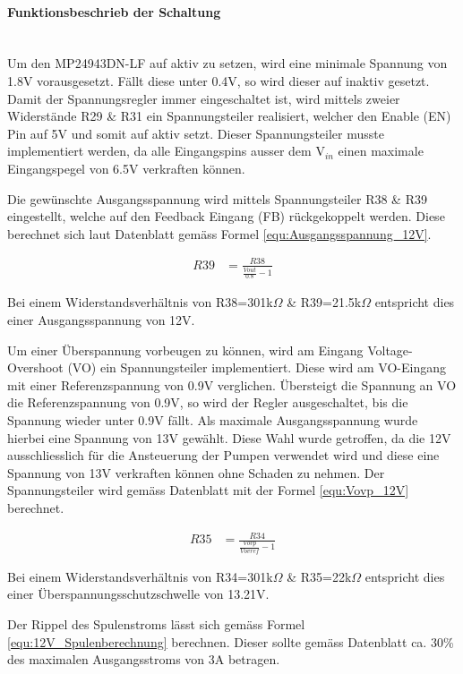 \paragraph{Funktionsbeschrieb der Schaltung}\mbox{}\\

Um den MP24943DN-LF auf aktiv zu setzen, wird eine minimale Spannung von 1.8V vorausgesetzt. Fällt diese unter 0.4V, so wird dieser auf inaktiv gesetzt. Damit der Spannungsregler immer eingeschaltet ist, wird mittels zweier Widerstände R29 \& R31 ein Spannungsteiler realisiert, welcher den Enable (EN) Pin auf 5V und somit auf aktiv setzt. Dieser Spannungsteiler musste implementiert werden, da alle Eingangspins ausser dem V$_{in}$ einen maximale Eingangspegel von 6.5V verkraften können.

Die gewünschte Ausgangsspannung wird mittels Spannungsteiler R38 \& R39 eingestellt, welche auf den Feedback Eingang (FB) rückgekoppelt werden. Diese berechnet sich laut Datenblatt gemäss Formel \ref{equ:Ausgangsspannung_12V}. 

\begin{align}
R39 &= \frac{R38}{\frac{Vout}{0.8}-1}
\label{equ:Ausgangsspannung_12V}
\end{align}

Bei einem Widerstandsverhältnis von R38=301k$\Omega$ \& R39=21.5k$\Omega$ entspricht dies einer Ausgangsspannung von 12V.

Um einer Überspannung vorbeugen zu können, wird am Eingang Voltage-Overshoot (VO) ein Spannungsteiler implementiert. Diese wird am VO-Eingang mit einer Referenzspannung von 0.9V verglichen. Übersteigt die Spannung an VO die Referenzspannung von 0.9V, so wird der Regler ausgeschaltet, bis die Spannung wieder unter 0.9V fällt. Als maximale Ausgangsspannung wurde hierbei eine Spannung von 13V gewählt. Diese Wahl wurde getroffen, da die 12V ausschliesslich für die Ansteuerung der Pumpen verwendet wird und diese eine Spannung von 13V verkraften können ohne Schaden zu nehmen. Der Spannungsteiler wird gemäss Datenblatt mit der Formel \ref{equ:Vovp_12V} berechnet. 

\begin{align}
R35 &= \frac{R34}{\frac{Vovp}{Vovref}-1}
\label{equ:Vovp_12V}
\end{align}

Bei einem Widerstandsverhältnis von R34=301k$\Omega$ \& R35=22k$\Omega$ entspricht dies einer Überspannungsschutzschwelle von 13.21V. 

Der Rippel des Spulenstroms lässt sich gemäss Formel \ref{equ:12V_Spulenberechnung} berechnen. Dieser sollte gemäss Datenblatt ca. 30\% des maximalen Ausgangsstroms von 3A betragen. 

